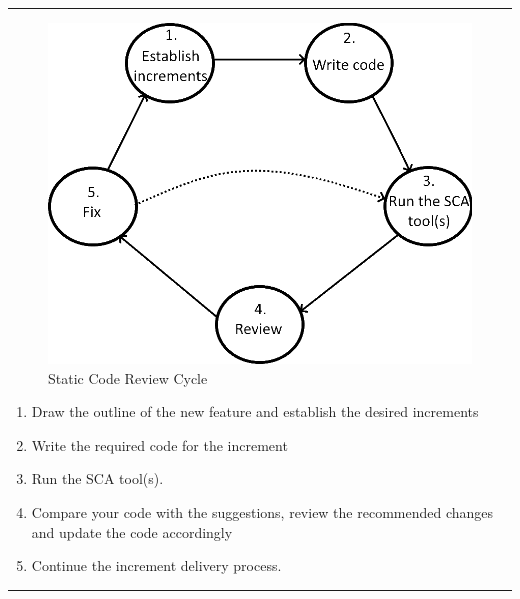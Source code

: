 \vspace{0.6cm}
\hrule
\vspace{-0.8cm}
\begin{minipage}{0.58\textwidth}
\begin{figure}[H]
    \centering
    \caption{Static Code Review Cycle}
    \includegraphics[scale=0.4]{./Images/sca2.png}
\end{figure}
\end{minipage}
\begin{minipage}{0.40\textwidth}\raggedleft
\vspace{1.5cm}
\begin{enumerate}%
    \item Draw the outline of the new feature and establish the desired increments
    \item Write the required code for the increment
    \item Run the SCA tool(s).
    \item Compare your code with the suggestions, review the recommended changes and update the code accordingly
    \item Continue the increment delivery process. 
\end{enumerate}
\end{minipage}
\vspace{0.3cm}
\hrule


